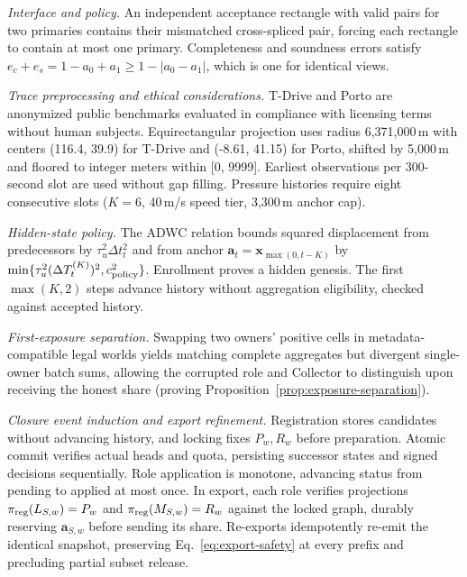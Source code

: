 \documentclass[conference,compsoc]{IEEEtran}
\theoremstyle{definition}
\numberwithin{equation}{section}
\numberwithin{table}{section}
\numberwithin{figure}{section}
\theoremstyle{plain}
\begin{document}
\par\noindent\emph{Interface and policy.}
\label{cor:submission-shared-tag}
An independent acceptance rectangle with valid pairs for two primaries contains their mismatched cross-spliced pair, forcing each rectangle to contain at most one primary.
\label{sec:history-interface}
Completeness and soundness errors satisfy \(e_c+e_s=1-a_0+a_1\ge1-|a_0-a_1|\), which is one for identical views.

\par\noindent\emph{Trace preprocessing and ethical considerations.}
\label{app:policy}
T-Drive and Porto are anonymized public benchmarks evaluated in compliance with licensing terms without human subjects. Equirectangular projection uses radius 6,371,000\,m with centers (116.4, 39.9) for T-Drive and (-8.61, 41.15) for Porto, shifted by 5,000\,m and floored to integer meters within [0, 9999]. Earliest observations per 300-second slot are used without gap filling. Pressure histories require eight consecutive slots (\(K=6\), 40\,m/s speed tier, 3,300\,m anchor cap).

\par\noindent\emph{Hidden-state policy.}
The ADWC relation bounds squared displacement from predecessors by \(\tau_u^2\Delta t_t^2\) and from anchor \(\mathbf a_t=\mathbf x_{\max(0,t-K)}\) by \(\min\{\tau_u^2(\Delta T_t^{(K)})^2,c_{\rm policy}^2\}\). Enrollment proves a hidden genesis. The first \(\max(K,2)\) steps advance history without aggregation eligibility, checked against accepted history.

\par\noindent\emph{First-exposure separation.}
\label{app:exposure-separation}
Swapping two owners' positive cells in metadata-compatible legal worlds yields matching complete aggregates but divergent single-owner batch sums, allowing the corrupted role and Collector to distinguish upon receiving the honest share (proving Proposition~\ref{prop:exposure-separation}).

\par\noindent\emph{Closure event induction and export refinement.}
\label{app:closure-proof}
\label{lem:export-refinement}
Registration stores candidates without advancing history, and locking fixes \(P_w, R_w\) before preparation. Atomic commit verifies actual heads and quota, persisting successor states and signed decisions sequentially. Role application is monotone, advancing status from pending to applied at most once. In export, each role verifies projections \(\pi_{\rm reg}(L_{S,w})=P_w\) and \(\pi_{\rm reg}(M_{S,w})=R_w\) against the locked graph, durably reserving \(\mathbf a_{S,w}\) before sending its share. Re-exports idempotently re-emit the identical snapshot, preserving Eq.~\eqref{eq:export-safety} at every prefix and precluding partial subset release.
\end{document}
